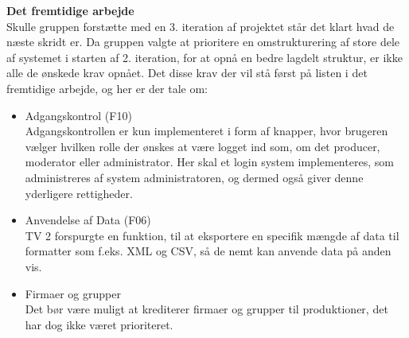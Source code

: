 \textbf{Det fremtidige arbejde} \\
Skulle gruppen forstætte med en 3. iteration af projektet står det klart hvad de næste skridt er. Da gruppen valgte at prioritere en omstrukturering af store dele af systemet i starten af 2. iteration, for at opnå en bedre lagdelt struktur, er ikke alle de ønskede krav opnået. Det disse krav der vil stå først på listen i det fremtidige arbejde, og her er der tale om:
\begin{itemize}
    \item Adgangskontrol (F10)\\
    Adgangskontrollen er kun implementeret i form af knapper, hvor brugeren vælger hvilken rolle der ønskes at være logget ind som, om det producer, moderator eller administrator. Her skal et login system implementeres, som administreres af system administratoren, og dermed også giver denne yderligere rettigheder. 
    \item Anvendelse af Data (F06) \\
    TV 2 forspurgte en funktion, til at eksportere en specifik mængde af data til formatter som f.eks. XML og CSV, så de nemt kan anvende data på anden vis.
    \item Firmaer og grupper \\
    Det bør være muligt at krediterer firmaer og grupper til produktioner, det har dog ikke været prioriteret. 
\end{itemize}
